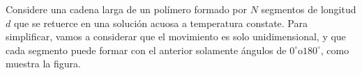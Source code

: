 Considere una cadena larga de un polímero formado por $N$ segmentos de longitud $d$ que se retuerce en una solución acuosa a temperatura constate. Para simplificar, vamos a considerar que el movimiento es solo unidimensional, y que cada segmento puede formar con el anterior solamente ángulos de $0^{\circ} \mathrm{o} 180^{\circ}$, como muestra la figura.



